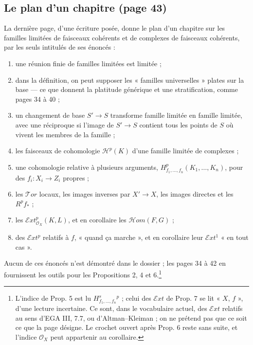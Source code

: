 \documentclass[11pt,a4paper]{article}
\begin{document}
\subsection*{Le plan d'un chapitre (page 43)}

La dernière page, d'une écriture posée, donne le plan d'un chapitre sur les
familles limitées de faisceaux cohérents et de complexes de faisceaux
cohérents, par les seuls intitulés de ses énoncés :
\begin{enumerate}
\item[Prop. 1] une réunion finie de familles limitées est limitée ;
\item[Prop. 2] dans la définition, on peut supposer les « familles
universelles » plates sur la base --- ce que donnent la platitude générique
et une stratification, comme pages 34 à 40 ;
\item[Prop. 3] un changement de base $S' \to S$ transforme famille limitée
en famille limitée, avec une réciproque si l'image de $S' \to S$ contient
tous les points de $S$ où vivent les membres de la famille ;
\item[Prop. 4] les faisceaux de cohomologie $\mathcal{H}^{p}(K)$ d'une
famille limitée de complexes ;
\item[Prop. 5] une cohomologie relative à plusieurs arguments,
$H^{p}_{f_1, \ldots, f_n}(K_1, \ldots, K_n)$, pour des $f_i : X_i \to Z_i$
propres ;
\item[Cor. 1--3] les $\mathcal{T}or$ locaux, les images inverses par
$X' \to X$, les images directes et les $R^{p}f_{*}$ ;
\item[Prop. 6] les $\mathcal{E}xt^{p}_{\mathcal{O}_X}(K, L)$, et en
corollaire les $\mathcal{H}om(F, G)$ ;
\item[Prop. 7] des $\mathcal{E}xt^{p}$ relatifs à $f$, « quand ça marche »,
et en corollaire leur $\mathcal{E}xt^{1}$ « en tout cas ».
\end{enumerate}
Aucun de ces énoncés n'est démontré dans le dossier ; les pages 34 à 42 en
fournissent les outils pour les Propositions 2, 4 et 6.\footnote{L'indice de
Prop. 5 est lu $H^{s}_{f_1, \ldots, f_n}{}^{p}$ ; celui des
$\mathcal{E}xt$ de Prop. 7 se lit « $X$, $f$ », d'une lecture incertaine.
Ce sont, dans le vocabulaire actuel, des $\mathcal{E}xt$ relatifs au sens
d'EGA III, 7.7, ou d'Altman--Kleiman ; on ne prétend pas que ce soit ce que
la page désigne. Le crochet ouvert après Prop. 6 reste sans suite, et
l'indice $\mathcal{O}_X$ peut appartenir au corollaire.}
\end{document}
